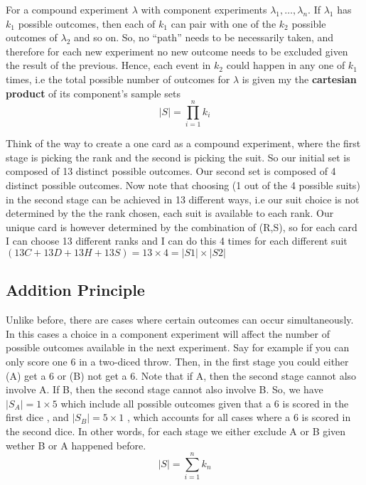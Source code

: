 \documentclass[english,course]{Notes}
\begin{document}
\par{For a compound experiment $\lambda$ with component experiments $\lambda_{1} , \dots , \lambda_{n}$. If $\lambda_{1} $ has $k_{1}$ possible outcomes, then each of $k_{1}$ can pair with one of the $k_{2}$ possible outcomes of $\lambda_{2}$ and so on. So, no ``path'' needs to be necessarily taken, and therefore for each new experiment no new outcome needs to be excluded given the result of the previous. Hence, each event in $k_{2}$ could happen in any one of $k_{1}$ times, i.e the total possible number of outcomes for $\lambda$ is given my the \textbf{cartesian product} of its component's sample sets $$ |S| = \prod_{i=1}^{n}k_{i}$$}
\par{ Think of the way to create a one card as a compound experiment, where the first stage is picking the rank and the second is picking the suit. So our initial set is composed of 13 distinct possible outcomes. Our second set is composed of 4 distinct possible outcomes. Now note that choosing (1 out of the 4 possible suits) in the second stage can be achieved in 13 different ways, i.e our suit choice is not determined by the the rank chosen, each suit is available to each rank. Our  unique card is however determined by the combination of (R,S), so for each card I can choose 13 different ranks and I can do this 4 times for each different suit $(13C + 13D + 13H + 13S) = 13 \times 4  = |S1| \times |S2|$}

\subsection{Addition Principle}
\par{Unlike before, there are cases where certain outcomes can occur simultaneously. In this cases a choice in a component experiment will affect the number of possible outcomes available in the next experiment. Say for example if you can only score one 6 in a two-diced throw. Then, in the first stage you could either (A) get a 6 or (B) not get a 6. Note that if A, then the second stage cannot also involve A. If B, then the second stage cannot also involve B. So, we have $|S_{A}| = 1 \times 5$ which include all possible outcomes given that a 6 is scored in the first dice , and $|S_{B}| = 5 \times 1$ , which accounts for all cases where a 6 is scored in the second dice. In other words, for each stage we either exclude A or B given wether B or A happened before. $$|S| = \sum_{i=1}^{n} k_{n}$$}

\end{document}

